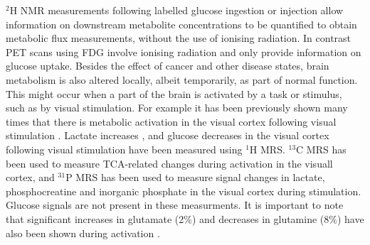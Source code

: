 $^2$H \ac{NMR} measurements following labelled glucose ingestion or injection allow information on downstream metabolite concentrations to be quantified to obtain metabolic flux measurements, without the use of ionising radiation. In contrast \ac{PET} scans using \ac{FDG} involve ionising radiation and only provide information on glucose uptake. Besides the effect of cancer and other disease states, brain metabolism is also altered locally, albeit temporarily, as part of normal function. This might occur when a part of the brain is activated by a task or stimulus, such as by visual stimulation. For example it has been previously shown many times that there is metabolic activation in the visual cortex following visual stimulation \cite{Kushner1988CerebralStimulation, Beland-Millar2018FluctuationsStimulation}. Lactate increases \cite{Prichard1991LactateStimulation., Sappey-Marinier1992EffectSpectroscopy, Fernandes2020MeasurementT}, and glucose decreases \cite{Lin2012InvestigatingT} in the visual cortex following visual stimulation have been measured using $^1$H \ac{MRS}. $^{13}$C \cite{Chhina2001MeasurementSpectroscopy} \ac{MRS} has been used to measure \ac{TCA}-related changes during activation in the visuall cortex, and $^{31}$P \ac{MRS} has been used to measure signal changes in lactate, phosphocreatine and inorganic phosphate in the visual cortex during stimulation\cite{Sappey-Marinier1992EffectSpectroscopy}. Glucose signals are not present in these measurments. It is important to note that significant increases in glutamate (2\%) and decreases in glutamine (8\%) have also been shown during activation \cite{Lin2012InvestigatingT}.
 
